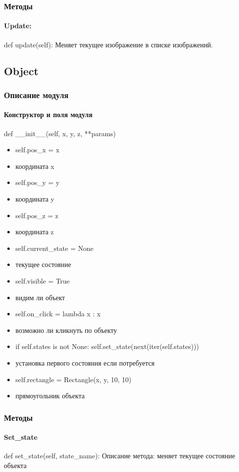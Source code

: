 \subsubsection{Методы}
\paragraph{Update:}
def update(self):
Меняет текущее изображение в списке изображений.

\subsection{Object}
\subsubsection{Описание модуля}
\paragraph{Конструктор и поля модуля}
def \_\_init\_\_(self, x, y, z, **params)
\begin{itemize}
	\item self.pos\_x = x
	\item координата x
	\item self.pos\_y = y
	\item координата y
	\item self.pos\_z = z
	\item координата z
	\item self.current\_state = None
	\item текущее состояние
	\item self.visible = True
	\item видим ли объект
	\item self.on\_click = lambda x : x
	\item возможно ли кликнуть по объекту
	\item if self.states is not None:
	self.set\_state(next(iter(self.states)))
	\item установка первого состояния если потребуется
	\item self.rectangle = Rectangle(x, y, 10, 10)
	\item прямоугольник объекта
\end{itemize}
\subsubsection{Методы}
\paragraph{Set\_state}
def set\_state(self, state\_name):
Описание метода: меняет текущее состояние объекта
